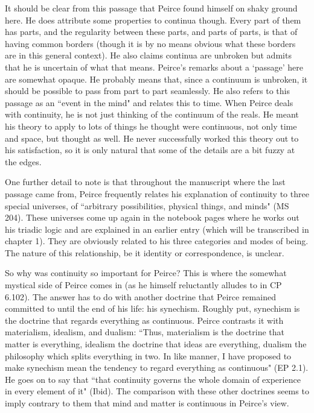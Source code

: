 \documentclass[12pt]{article}
\begin{document}
\noindent It should be clear from this passage that Peirce found himself on shaky ground here. He does attribute some properties to continua though. Every part of them has parts, and the regularity between these parts, and parts of parts, is that of having common borders (though it is by no means obvious what these borders are in this general context). He also claims continua are unbroken but admits that he is uncertain of what that means. Peirce's remarks about a `passage' here are somewhat opaque. He probably means that, since a continuum is unbroken, it should be possible to pass from part to part seamlessly. He also refers to this passage as an ``event in the mind" and relates this to time. When Peirce deals with continuity, he is not just thinking of the continuum of the reals. He meant his theory to apply to lots of things he thought were continuous, not only time and space, but thought as well. He never successfully worked this theory out to his satisfaction, so it is only natural that some of the details are a bit fuzzy at the edges.

One further detail to note is that throughout the manuscript where the last passage came from, Peirce frequently relates his explanation of continuity to three special universes, of ``arbitrary possibilities, physical things, and minds" (MS 204). These universes come up again in the notebook pages where he works out his triadic logic and are explained in an earlier entry (which will be transcribed in chapter 1). They are obviously related to his three categories and modes of being. The nature of this relationship, be it identity or correspondence, is unclear.

So why was continuity so important for Peirce? This is where the somewhat mystical side of Peirce comes in (as he himself reluctantly alludes to in CP 6.102). The answer has to do with another doctrine that Peirce remained committed to until the end of his life: his synechism. Roughly put, synechism is the doctrine that regards everything as continuous. Peirce contrasts it with materialism, idealism, and dualism: ``Thus, materialism is the doctrine that matter is everything, idealism the doctrine that ideas are everything, dualism the philosophy which splits everything in two. In like manner, I have proposed to make synechism mean the tendency to regard everything as continuous" (EP 2.1). He goes on to say that ``that continuity governs the whole domain of experience in every element of it" (Ibid). The comparison with these other doctrines seems to imply contrary to them that mind and matter is continuous in Peirce's view.
\end{document}
